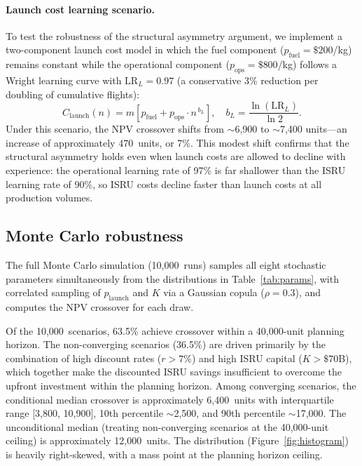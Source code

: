\documentclass[preprint,12pt]{elsarticle}
\begin{document}
\paragraph{Launch cost learning scenario.} To test the robustness of the structural asymmetry argument, we implement a two-component launch cost model in which the fuel component ($p_{\mathrm{fuel}} = \$200$/kg) remains constant while the operational component ($p_{\mathrm{ops}} = \$800$/kg) follows a Wright learning curve with $\mathrm{LR}_L = 0.97$ (a conservative 3\% reduction per doubling of cumulative flights):
\begin{equation}
  C_{\mathrm{launch}}(n) = m \left[ p_{\mathrm{fuel}} + p_{\mathrm{ops}} \cdot n^{\,b_L} \right], \quad b_L = \frac{\ln(\mathrm{LR}_L)}{\ln 2}.
  \label{eq:launch_learning}
\end{equation}
Under this scenario, the NPV crossover shifts from $\sim$6{,}900 to $\sim$7{,}400 units---an increase of approximately 470~units, or 7\%. This modest shift confirms that the structural asymmetry holds even when launch costs are allowed to decline with experience: the operational learning rate of 97\% is far shallower than the ISRU learning rate of 90\%, so ISRU costs decline faster than launch costs at all production volumes.

\subsection{Monte Carlo robustness}

The full Monte Carlo simulation (10{,}000~runs) samples all eight stochastic parameters simultaneously from the distributions in Table~\ref{tab:params}, with correlated sampling of $p_{\mathrm{launch}}$ and $K$ via a Gaussian copula ($\rho = 0.3$), and computes the NPV crossover for each draw.

Of the 10{,}000~scenarios, 63.5\% achieve crossover within a 40{,}000-unit planning horizon. The non-converging scenarios (36.5\%) are driven primarily by the combination of high discount rates ($r > 7\%$) and high ISRU capital ($K > \$70$B), which together make the discounted ISRU savings insufficient to overcome the upfront investment within the planning horizon. Among converging scenarios, the conditional median crossover is approximately 6{,}400~units with interquartile range [3{,}800, 10{,}900], 10th percentile $\sim$2{,}500, and 90th percentile $\sim$17{,}000. The unconditional median (treating non-converging scenarios at the 40{,}000-unit ceiling) is approximately 12{,}000~units. The distribution (Figure~\ref{fig:histogram}) is heavily right-skewed, with a mass point at the planning horizon ceiling.
\end{document}

